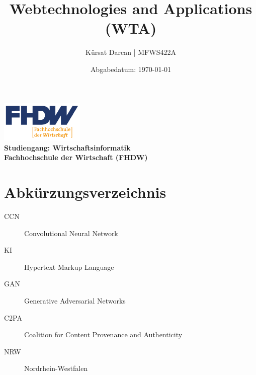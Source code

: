 \documentclass[a4paper,12pt]{article}
\title{\textbf{Webtechnologies and Applications (WTA)}}
\author{Kürsat Darcan | MFWS422A}
\date{Abgabedatum: \today}
\begin{document}
\maketitle
\thispagestyle{empty}
\vspace{2cm}
\begin{center}
    \includegraphics[width=0.3\textwidth]{FHDW_Logo_RGB-01.svg.png} %
    \\
    \vspace{1cm}
    \textbf{Studiengang: Wirtschaftsinformatik}\\
    \textbf{Fachhochschule der Wirtschaft (FHDW)}
\end{center}
\newpage

\renewcommand{\thepage}{\roman{page}} %
\tableofcontents
\newpage



\section*{Abkürzungsverzeichnis}
\begin{description}
    \item[CCN] Convolutional Neural Network
    \item[KI] Hypertext Markup Language
    \item[GAN] Generative Adversarial Networks
    \item[C2PA] Coalition for Content Provenance and Authenticity
    \item[NRW] Nordrhein-Westfalen
\end{description}
\newpage

\renewcommand{\thepage}{\arabic{page}} %
\setcounter{page}{1}


\end{document}
